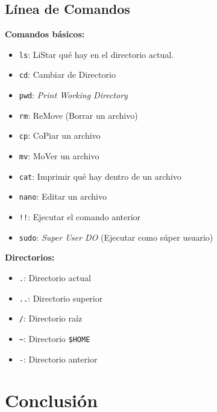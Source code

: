 \documentclass[aspectratio=43]{beamer}
\begin{document}
    \subsection{Línea de Comandos}
     \begin{frame}[fragile]{\subsecname}{}
        \textbf{Comandos básicos:}
        \begin{itemize}
            \item \verb!ls!: LiStar qué hay en el directorio actual.
            \item \verb!cd!: Cambiar de Directorio
            \item \verb!pwd!: \textit{Print Working Directory}
            \item \verb!rm!: ReMove (Borrar un archivo)
            \item \verb!cp!: CoPiar un archivo
            \item \verb!mv!: MoVer un archivo
            \item \verb!cat!: Imprimir qué hay dentro de un archivo
            \item \verb!nano!: Editar un archivo
            \item \verb|!!|: Ejecutar el comando anterior
            \item \verb|sudo|: \textit{Super User DO} (Ejecutar como súper usuario)
        \end{itemize}
    \end{frame}

    \begin{frame}[fragile]{\subsecname}{}
        \textbf{Directorios:}
        \begin{itemize}
            \item \verb!.!: Directorio actual
            \item \verb!..!: Directorio superior
            \item \verb!/!: Directorio raíz
            \item \verb!~!: Directorio \verb!$HOME!
            \item \verb!-!: Directorio anterior
        \end{itemize}
    \end{frame}


    \section{Conclusión}
\end{document}
